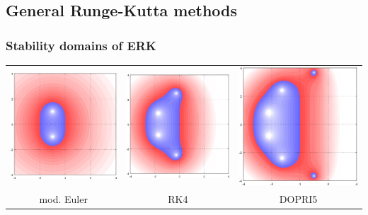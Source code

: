 \documentclass[ignorenonframetext,notheorems,aspectratio=1610]{beamer}
\begin{document}
\subsection{General Runge-Kutta methods}
\frame{}
\frame{}
\frame{}
\begin{frame}
  \frametitle{Stability domains of ERK}
  \begin{tabular}{ccc}
    \includegraphics[width=.3\textwidth]{fig/stability-RK2}
    &
    \includegraphics[width=.3\textwidth]{fig/stability-RK4}
    &
    \includegraphics[width=.3\textwidth]{fig/stability-DOPRI5}
    \\
    mod. Euler & RK4 & DOPRI5
  \end{tabular}
\end{frame}
\frame{}
\end{document}
